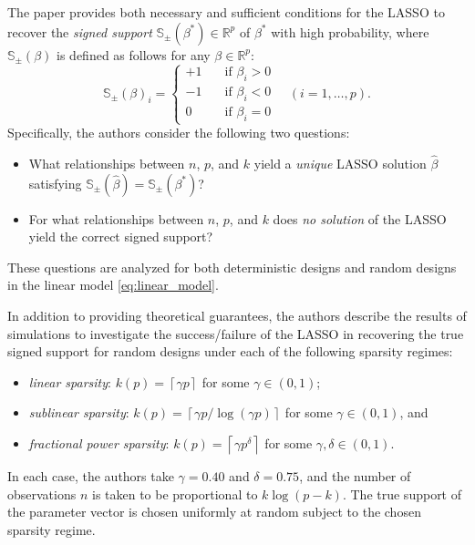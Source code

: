 \documentclass[letterpaper,12pt]{article}
\newcommand{\ceil}[1]{\left\lceil#1\right\rceil}
\begin{document}
The paper \cite{wainwright06} provides both necessary and sufficient
conditions for the LASSO to recover the \textit{signed support}
$\mathbb{S}_\pm(\beta^\ast) \in \mathbb{R}^p$ of $\beta^\ast$ with
high probability, where $\mathbb{S}_\pm(\beta)$ is defined as follows
for any $\beta \in \mathbb{R}^p$:
\begin{equation*}
  \mathbb{S}_\pm(\beta)_i =
  \begin{cases}
    +1 & \quad \text{if $\beta_i > 0$} \\
    -1 & \quad \text{if $\beta_i < 0$} \\
    0 & \quad \text{if $\beta_i = 0$}
  \end{cases}
  \quad (i = 1, \ldots, p).
\end{equation*}
Specifically, the authors consider the following two questions:
\begin{itemize}
\item What relationships between $n$, $p$, and $k$ yield a
  \emph{unique} LASSO solution $\hat{\beta}$ satisfying
  $\mathbb{S}_\pm(\hat{\beta}) = \mathbb{S}_\pm(\beta^\ast)$?
\item For what relationships between $n$, $p$, and $k$ does \emph{no
    solution} of the LASSO yield the correct signed support?
\end{itemize}
These questions are analyzed for both deterministic designs and random
designs in the linear model \eqref{eq:linear_model}.

In addition to providing theoretical guarantees, the authors describe
the results of simulations to investigate the success/failure of the
LASSO in recovering the true signed support for random designs under
each of the following sparsity regimes:
\begin{itemize}
\item \textit{linear sparsity}: $k(p) = \ceil{\gamma p}$ for some
  $\gamma \in (0, 1)$;
\item \textit{sublinear sparsity}:
  $k(p) = \ceil{\gamma p / \log(\gamma p)}$ for some
  $\gamma \in (0, 1)$, and
\item \textit{fractional power sparsity}:
  $k(p) = \ceil{\gamma p^\delta}$ for some
  $\gamma, \delta \in (0, 1)$.
\end{itemize}
In each case, the authors take $\gamma = 0.40$ and $\delta = 0.75$,
and the number of observations $n$ is taken to be proportional to
$k\log(p - k)$. The true support of the parameter vector is chosen
uniformly at random subject to the chosen sparsity regime.
\end{document}
